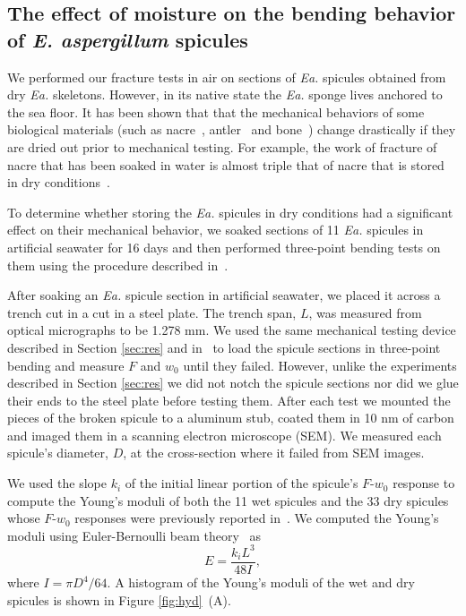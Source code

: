 \documentclass[12pt,onecolumn]{article}
\makeatletter
\newcommand{\EA}{\textit{Ea.\@}\xspace}
\makeatother
\begin{document}
\begin{bibunit}
\section{The effect of moisture on the bending behavior of \textit{E. aspergillum} spicules}
\label{sec:hyd}

We performed our fracture tests in air on sections of \EA spicules obtained from dry \EA skeletons. However, in its native state the \EA sponge lives anchored to the sea floor. It has been shown that that the mechanical behaviors of some biological materials (such as nacre~\cite{barthelat2007mechanics}, antler~\cite{chen2008fracture} and bone~\cite{chen2008fracture}) change drastically if they are dried out prior to mechanical testing. For example, the work of fracture of nacre that has been soaked in water is almost triple that of nacre that is stored in dry conditions~\cite{jackson1988}.

To determine whether storing the \EA spicules in dry conditions had a significant effect on their mechanical behavior,  we soaked sections of 11 \EA spicules in artificial seawater for 16 days and then performed three-point bending tests on them using the procedure described in~\cite{monn2017enhanced}. 

After soaking an \EA spicule section in artificial seawater, we placed it across a trench cut in a cut in a steel plate. The trench span, $L$, was measured from optical micrographs to be 1.278 mm. We used the same mechanical testing device described in Section \ref{sec:res} and in~\cite{monn2017enhanced} to load the spicule sections in three-point bending and measure $F$ and $w_0$ until they failed. However, unlike the experiments described in Section \ref{sec:res} we did not notch the spicule sections nor did we glue their ends to the steel plate before testing them. After each test we mounted the pieces of the broken spicule to a aluminum stub, coated them in 10 nm of carbon and imaged them in a scanning electron microscope (SEM). We measured each spicule's diameter, $D$, at the cross-section where it failed from SEM images.

We used the slope $k_i$ of the initial linear portion of the spicule's $F$-$w_0$ response to compute the Young's moduli of both the 11 wet spicules and the 33 dry spicules whose $F$-$w_0$ responses were previously reported in~\cite{monn2017enhanced}. We computed the Young's moduli using Euler-Bernoulli beam theory~\cite{gere1997mechanics} as
%
\begin{equation}
\label{eq0}
E=\frac{k_i L^3}{48 I},
\end{equation}
%
where $I=\pi D^4/64$. A histogram of the Young's moduli of the wet and dry spicules is shown in Figure \ref{fig:hyd}~(A). 


\end{bibunit}
\end{document}
